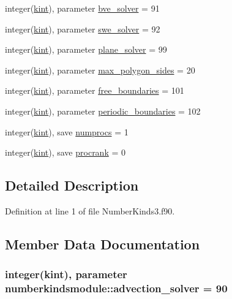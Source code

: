 \begin{DoxyCompactItemize}
integer(\hyperlink{classnumberkindsmodule_a50957e2e9ebdf9a5c6da0641adf3a1b3}{kint}), parameter \hyperlink{classnumberkindsmodule_a0f39550048d794cfa17fae083fa8c144}{bve\+\_\+solver} = 91
\item 
integer(\hyperlink{classnumberkindsmodule_a50957e2e9ebdf9a5c6da0641adf3a1b3}{kint}), parameter \hyperlink{classnumberkindsmodule_a4c6e608e5607bcb2090a2e1b3dd482c5}{swe\+\_\+solver} = 92
\item 
integer(\hyperlink{classnumberkindsmodule_a50957e2e9ebdf9a5c6da0641adf3a1b3}{kint}), parameter \hyperlink{classnumberkindsmodule_ae767615e59f7444b7ff78296280c12b6}{plane\+\_\+solver} = 99
\item 
integer(\hyperlink{classnumberkindsmodule_a50957e2e9ebdf9a5c6da0641adf3a1b3}{kint}), parameter \hyperlink{classnumberkindsmodule_aee005c7ee017fa4369247b38c1fea7ba}{max\+\_\+polygon\+\_\+sides} = 20
\item 
integer(\hyperlink{classnumberkindsmodule_a50957e2e9ebdf9a5c6da0641adf3a1b3}{kint}), parameter \hyperlink{classnumberkindsmodule_a7e462ddc704343657b060034143bdabb}{free\+\_\+boundaries} = 101
\item 
integer(\hyperlink{classnumberkindsmodule_a50957e2e9ebdf9a5c6da0641adf3a1b3}{kint}), parameter \hyperlink{classnumberkindsmodule_a76e3561e9d937b2db78a7f1921229140}{periodic\+\_\+boundaries} = 102
\item 
integer(\hyperlink{classnumberkindsmodule_a50957e2e9ebdf9a5c6da0641adf3a1b3}{kint}), save \hyperlink{classnumberkindsmodule_af9edcbb4a68ceff7853d6b30d97dbae7}{numprocs} = 1
\item 
integer(\hyperlink{classnumberkindsmodule_a50957e2e9ebdf9a5c6da0641adf3a1b3}{kint}), save \hyperlink{classnumberkindsmodule_a7c6975d710b4d578d515c3d3312043fc}{procrank} = 0
\end{DoxyCompactItemize}


\subsection{Detailed Description}


Definition at line 1 of file Number\+Kinds3.\+f90.



\subsection{Member Data Documentation}
\hypertarget{classnumberkindsmodule_a2bea0cc446c8e3bad6c460cb26ee0596}{
\subsubsection[{advection\+\_\+solver}]{\setlength{\rightskip}{0pt plus 5cm}integer({\bf kint}), parameter numberkindsmodule\+::advection\+\_\+solver = 90}}\label{classnumberkindsmodule_a2bea0cc446c8e3bad6c460cb26ee0596}


